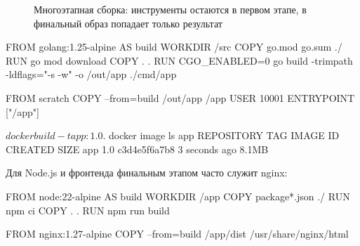 \begin{figure}[htbp]
\centering
{}
\caption{Многоэтапная сборка: инструменты остаются в первом этапе,
в финальный образ попадает только результат}\label{fig:multistage}
\end{figure}

\begin{code}[language=dockerfile]
FROM golang:1.25-alpine AS build
WORKDIR /src
COPY go.mod go.sum ./
RUN go mod download
COPY . .
RUN CGO_ENABLED=0 go build -trimpath -ldflags="-s -w" -o /out/app ./cmd/app

FROM scratch
COPY --from=build /out/app /app
USER 10001
ENTRYPOINT ["/app"]
\end{code}

\begin{code}[language=bash]
$ docker build -t app:1.0 .
$ docker image ls app
REPOSITORY   TAG   IMAGE ID       CREATED         SIZE
app          1.0   c3d4e5f6a7b8   3 seconds ago   8.1MB
\end{code}

Для Node.js и фронтенда финальным этапом часто служит nginx:

\begin{code}[language=dockerfile]
FROM node:22-alpine AS build
WORKDIR /app
COPY package*.json ./
RUN npm ci
COPY . .
RUN npm run build

FROM nginx:1.27-alpine
COPY --from=build /app/dist /usr/share/nginx/html
\end{code}

